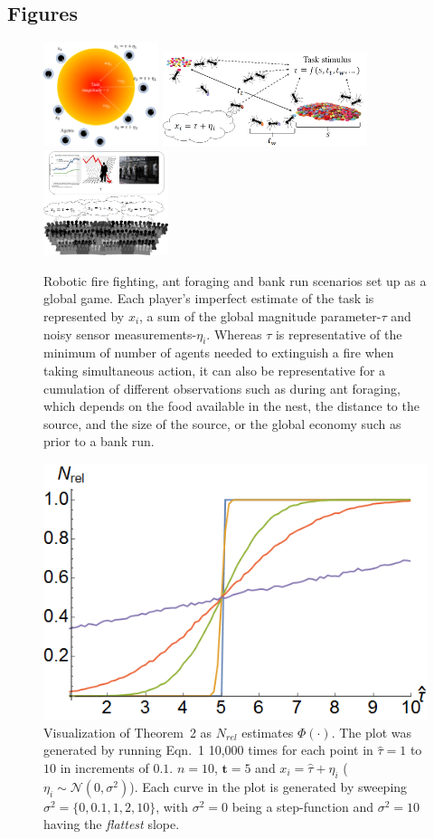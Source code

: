 \documentclass[12pt]{article}
\def\td{\mathbf{t}}   %
\begin{document}


\newpage
\subsection*{Figures}
\begin{figure}[!ht]
	\centering\includegraphics[height=1.2in]{figures/firefighting.png}
		\centering\includegraphics[height=1.1in]{figures/foraging.png}
	\centering\includegraphics[height=1.2in]
{figures/bankrun.png}
	\centering\caption{Robotic fire fighting, ant foraging and bank run scenarios set up as a global game. Each player's imperfect estimate of the task is represented by $x_i$, a sum of the global magnitude parameter-$\tau$ and noisy sensor measurements-$\eta_i$. Whereas $\tau$ is representative of the minimum of number of agents needed to extinguish a fire when taking simultaneous action, it can also be representative for a cumulation of different observations such as during ant foraging, which depends on the food available in the nest, the distance to the source, and the size of the source, or the global economy such as prior to a bank run.}\vspace{-10px}
\end{figure}


\newpage
\begin{figure}[!ht]
	\centering\includegraphics[width=0.3\columnwidth]{figures/thm2fig.png}
	\centering\caption{Visualization of Theorem~2 as $N_{rel}$ estimates $\Phi(\cdot)$. The plot was generated by running Eqn.~1 10,000 times for each point in $\hat{\tau} = 1$ to $10$ in increments of $0.1$. $n = 10$, $\td = 5$ and $x_i = \hat{\tau} + \eta_i$ ($\eta_i \sim\mathcal{N}(0, \sigma^2)$). Each curve in the plot is generated by sweeping $\sigma^2 = \{0, 0.1, 1, 2, 10\}$, with $\sigma^2 = 0$ being a step-function and $\sigma^2 = 10$ having the \emph{flattest} slope.}\label{fig:thm2fig}
\end{figure}
\end{document}
